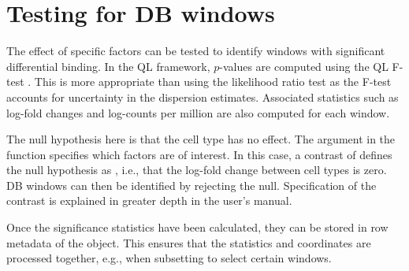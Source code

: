 \documentclass{report}\usepackage[]{graphicx}\usepackage[usenames,dvipsnames]{color}
\newcommand{\hlnum}[1]{\textcolor[rgb]{0.816,0.125,0.439}{#1}}%
\newcommand{\hlopt}[1]{\textcolor[rgb]{0,0,0}{#1}}%
\newcommand{\hlstd}[1]{\textcolor[rgb]{0.251,0.251,0.251}{#1}}%
\newcommand{\hlkwb}[1]{\textcolor[rgb]{0,0,0}{#1}}%
\newcommand{\hlkwc}[1]{\textcolor[rgb]{0.251,0.251,0.251}{#1}}%
\newcommand{\hlkwd}[1]{\textcolor[rgb]{0.878,0.439,0.125}{#1}}%
\newenvironment{knitrout}{}{} %
\begin{document}
\section{Testing for DB windows}
The effect of specific factors can be tested to identify windows with significant differential binding. 
In the QL framework, $p$-values are computed using the QL F-test \cite{lund2012}. 
This is more appropriate than using the likelihood ratio test as the F-test accounts for uncertainty in the dispersion estimates. 
Associated statistics such as log-fold changes and log-counts per million are also computed for each window.

\begin{knitrout}
\color{fgcolor}
\end{knitrout}

The null hypothesis here is that the cell type has no effect. 
The  argument in the  function specifies which factors are of interest. 
In this case, a contrast of  defines the null hypothesis as , i.e., that the log-fold change between cell types is zero. 
DB windows can then be identified by rejecting the null. 
Specification of the contrast is explained in greater depth in the  user's manual. 

Once the significance statistics have been calculated, they can be stored in row metadata of the  object.
This ensures that the statistics and coordinates are processed together, e.g., when subsetting to select certain windows.

\begin{knitrout}
\color{fgcolor}
\end{knitrout}
\end{document}
